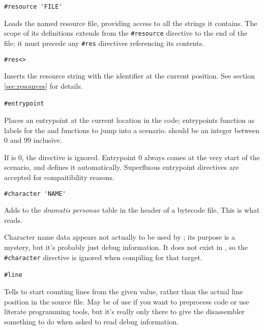     \lstinline|#resource 'FILE'|
    \begin{cmdesc}
      Loads the named resource file, providing access to all the strings it
      contains.  The scope of its definitions extends from the
      \lstinline|#resource| directive to the end of the file; it must precede
      any \lstinline|#res| directives referencing its contents.
    \end{cmdesc}

    \lstinline|#res<|\lstinline|>|
    \begin{cmdesc}
      Inserts the resource string with the identifier  at the
      current position.  See section \ref{sec:resources} for details.
    \end{cmdesc}

    \lstinline|#entrypoint|~
    \begin{cmdesc}
      Places an entrypoint at the current location in the code; entrypoints
      function as labels for the  and  functions to
      jump into a scenario.   should be an integer between 0 and
      99 inclusive.

      If  is 0, the directive is ignored.  Entrypoint 0 always
      comes at the very start of the scenario, and \compiler{} defines it
      automatically.  Superfluous entrypoint directives are accepted for
      compaitibility reasons.
    \end{cmdesc}

    \lstinline|#character 'NAME'|
    \begin{cmdesc}
      Adds  to the \textit{dramatis personae} table in the header
      of a bytecode file.  This is what  reads.

      Character name data appears not actually to be used by \reallive; its
      purpose is a mystery, but it's probably just debug information.  It does
      not exist in \avgns, so the \lstinline|#character| directive is ignored
      when compiling for that target.
    \end{cmdesc}

    \lstinline|#line|~
    \begin{cmdesc}
      Tells \compiler{} to start counting lines from the given value, rather than
      the actual line position in the source file.  May be of use if you want to
      preprocess code or use literate programming tools, but it's really only
      there to give the disassembler something to do when asked to read debug
      information.
    \end{cmdesc}


